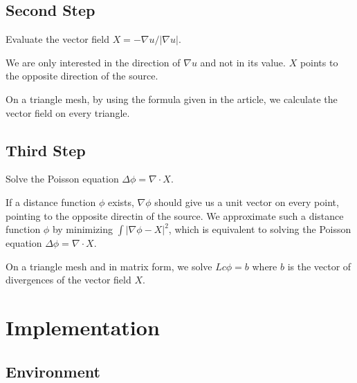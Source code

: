 \documentclass[a4paper,12pt,twoside]{article}
\begin{document}
\subsection{Second Step}
Evaluate the vector field $X = -\nabla u / \left | \nabla u \right |$.

We are only interested in the direction of $\nabla u$ and not in its value. $X$ points to the opposite direction of the source.

On a triangle mesh, by using the formula given in the article, we calculate the vector field on every triangle.

\subsection{Third Step}

Solve the Poisson equation $\Delta \phi = \nabla \cdot X$.

If a distance function $\phi$ exists, $\nabla \phi$ should give us a unit vector on every point, pointing to the opposite directin of the source. We approximate such a distance function $\phi$ by minimizing $\int \left | \nabla \phi - X \right |^{2}$, which is equivalent to solving the Poisson equation $\Delta \phi = \nabla \cdot X$.

On a triangle mesh and in matrix form, we solve $Lc\phi = b$ where $b$ is the vector of divergences of the vector field $X$.




\section{Implementation}

\subsection{Environment}
\end{document}
